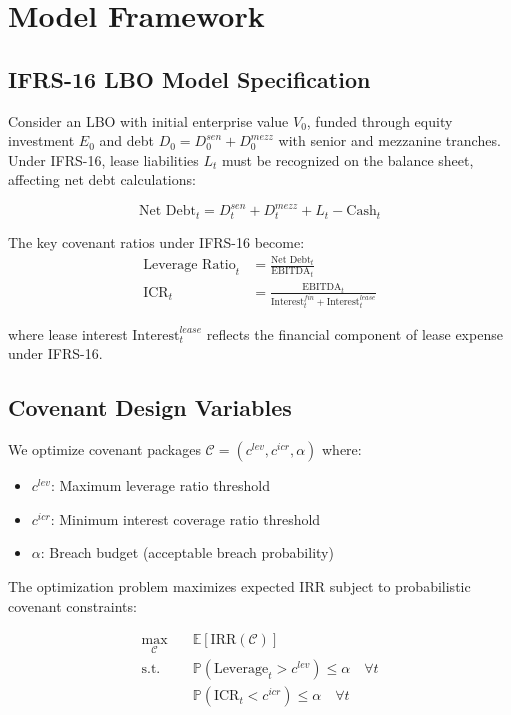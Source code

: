 \documentclass[11pt,a4paper]{article}
\newcommand{\E}{\mathbb{E}}
\newcommand{\Prob}{\mathbb{P}}
\newcommand{\alphabudget}{\alpha}   %
\begin{document}
\section{Model Framework}

\subsection{IFRS-16 LBO Model Specification}

Consider an LBO with initial enterprise value $V_0$, funded through equity investment $E_0$ and debt $D_0 = D_0^{sen} + D_0^{mezz}$ with senior and mezzanine tranches. Under IFRS-16, lease liabilities $L_t$ must be recognized on the balance sheet, affecting net debt calculations:

\begin{equation}
\text{Net Debt}_t = D_t^{sen} + D_t^{mezz} + L_t - \text{Cash}_t
\end{equation}

The key covenant ratios under IFRS-16 become:
\begin{align}
\text{Leverage Ratio}_t &= \frac{\text{Net Debt}_t}{\text{EBITDA}_t} \\
\text{ICR}_t &= \frac{\text{EBITDA}_t}{\text{Interest}_t^{fin} + \text{Interest}_t^{lease}}
\end{align}

where lease interest $\text{Interest}_t^{lease}$ reflects the financial component of lease expense under IFRS-16.

\subsection{Covenant Design Variables}

We optimize covenant packages $\mathcal{C} = (c^{lev}, c^{icr}, \alphabudget)$ where:
\begin{itemize}
\item $c^{lev}$: Maximum leverage ratio threshold
\item $c^{icr}$: Minimum interest coverage ratio threshold  
\item $\alphabudget$: Breach budget (acceptable breach probability)
\end{itemize}

The optimization problem maximizes expected IRR subject to probabilistic covenant constraints:

\begin{align}
\max_{\mathcal{C}} \quad &\E[\text{IRR}(\mathcal{C})] \\
\text{s.t.} \quad &\Prob(\text{Leverage}_t > c^{lev}) \leq \alphabudget \quad \forall t \\
&\Prob(\text{ICR}_t < c^{icr}) \leq \alphabudget \quad \forall t
\end{align}
\end{document}
